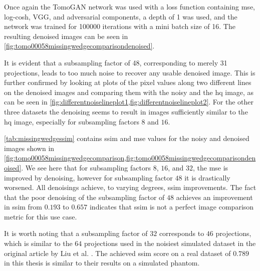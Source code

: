 Once again the TomoGAN network was used with a loss function containing \gls{mse}, log-cosh, VGG, and adversarial components, a depth of 1 was used, and the network was trained for 100000 iterations with a mini batch size of 16. The resulting denoised images can be seen in \cref{fig:tomo00058missingwedgecomparisondenoised}. 

It is evident that a subsampling factor of 48, corresponding to merely 31 projections, leads to too much noise to recover any usable denoised image. This is further confirmed by looking at plots of the pixel values along two different lines on the denoised images and comparing them with the noisy and the \gls{hq} image, as can be seen in \cref{fig:differentnoiselineplot1,fig:differentnoiselineplot2}. For the other three datasets the denoising seems to result in images sufficiently similar to the \gls{hq} image, especially for subsampling factors $8$ and $16$. 

\cref{tab:missingwedgessim} contains \gls{ssim} and \gls{mse} values for the noisy and denoised images shown in \cref{fig:tomo00058missingwedgecomparison,fig:tomo00058missingwedgecomparisondenoised}. We see here that for subsampling factors $8$, $16$, and $32$, the \gls{mse} is improved by denoising, however for subsampling factor $48$ it is drastically worsened. All denoisings achieve, to varying degrees, \gls{ssim} improvements. The fact that the poor denoising of the subsampling factor of $48$ achieves an improvement in \gls{ssim} from $0.193$ to $0.657$ indicates that \gls{ssim} is not a perfect image comparison metric for this use case. 

It is worth noting that a subsampling factor of $32$ corresponds to $46$ projections, which is similar to the $64$ projections used in the noisiest simulated dataset in the original article by Liu et al. \cite{liu2020tomogan}. The achieved \gls{ssim} score on a real dataset of $0.789$ in this thesis is similar to their results on a simulated phantom. 



